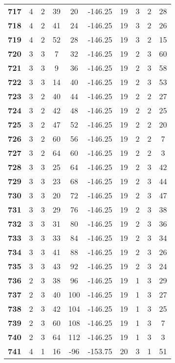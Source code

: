 \documentclass[12pt,letterpaper, onecolumn]{exam}
\begin{document}
\begin{longtable}{cccccccccc}
    \textbf{717} & 4 & 2 & 39 & 20 & -146.25 & 19 & 3 & 2 & 28 \\ 
    \textbf{718} & 4 & 2 & 41 & 24 & -146.25 & 19 & 3 & 2 & 26 \\ 
    \textbf{719} & 4 & 2 & 52 & 28 & -146.25 & 19 & 3 & 2 & 15 \\ 
    \textbf{720} & 3 & 3 & 7 & 32 & -146.25 & 19 & 2 & 3 & 60 \\ 
    \textbf{721} & 3 & 3 & 9 & 36 & -146.25 & 19 & 2 & 3 & 58 \\ 
    \textbf{722} & 3 & 3 & 14 & 40 & -146.25 & 19 & 2 & 3 & 53 \\ 
    \textbf{723} & 3 & 2 & 40 & 44 & -146.25 & 19 & 2 & 2 & 27 \\ 
    \textbf{724} & 3 & 2 & 42 & 48 & -146.25 & 19 & 2 & 2 & 25 \\ 
    \textbf{725} & 3 & 2 & 47 & 52 & -146.25 & 19 & 2 & 2 & 20 \\ 
    \textbf{726} & 3 & 2 & 60 & 56 & -146.25 & 19 & 2 & 2 & 7 \\ 
    \textbf{727} & 3 & 2 & 64 & 60 & -146.25 & 19 & 2 & 2 & 3 \\ 
    \textbf{728} & 3 & 3 & 25 & 64 & -146.25 & 19 & 2 & 3 & 42 \\ 
    \textbf{729} & 3 & 3 & 23 & 68 & -146.25 & 19 & 2 & 3 & 44 \\       \hline
    \textbf{730} & 3 & 3 & 20 & 72 & -146.25 & 19 & 2 & 3 & 47 \\ 
    \textbf{731} & 3 & 3 & 29 & 76 & -146.25 & 19 & 2 & 3 & 38 \\ 
    \textbf{732} & 3 & 3 & 31 & 80 & -146.25 & 19 & 2 & 3 & 36 \\ 
    \textbf{733} & 3 & 3 & 33 & 84 & -146.25 & 19 & 2 & 3 & 34 \\ 
    \textbf{734} & 3 & 3 & 41 & 88 & -146.25 & 19 & 2 & 3 & 26 \\ 
    \textbf{735} & 3 & 3 & 43 & 92 & -146.25 & 19 & 2 & 3 & 24 \\ 
    \textbf{736} & 2 & 3 & 38 & 96 & -146.25 & 19 & 1 & 3 & 29 \\ 
    \textbf{737} & 2 & 3 & 40 & 100 & -146.25 & 19 & 1 & 3 & 27 \\ 
    \textbf{738} & 2 & 3 & 42 & 104 & -146.25 & 19 & 1 & 3 & 25 \\ 
    \textbf{739} & 2 & 3 & 60 & 108 & -146.25 & 19 & 1 & 3 & 7 \\ 
    \textbf{740} & 2 & 3 & 64 & 112 & -146.25 & 19 & 1 & 3 & 3 \\ 
    \textbf{741} & 4 & 1 & 16 & -96 & -153.75 & 20 & 3 & 1 & 51 \\ 

\end{longtable}
\end{document}
